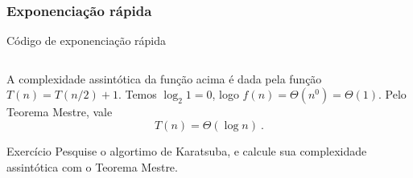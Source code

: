 \begin{frame}[fragile]
    \frametitle{Exponenciação rápida}

    \begin{block}{Código de exponenciação rápida}
        \footnotesize
        \inputminted{cpp}{codigos/fexp.cpp}    
    \end{block} \pause

    A complexidade assintótica da função acima é dada pela função $T(n) = T(n/2) + 1$. Temos $\log_2 1 = 0$, logo $f(n) = \Theta(n^0) = \Theta(1)$. \pause Pelo Teorema Mestre, vale
        \[ T(n) =  \Theta(\log n) \ . \]

    \begin{block}{Exercício} \pause
        Pesquise o algortimo de Karatsuba, e calcule sua complexidade assintótica com o Teorema Mestre.
    \end{block}
    
\end{frame}